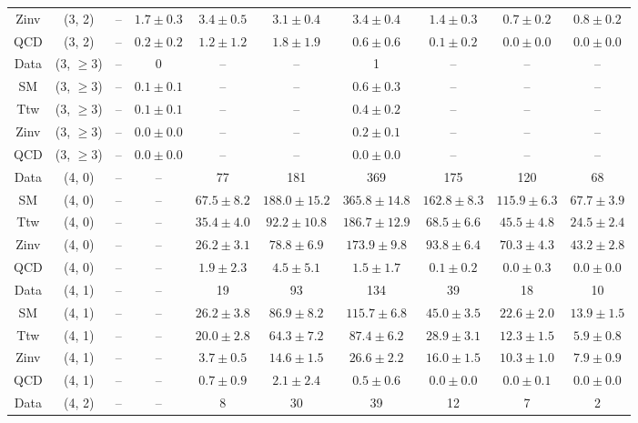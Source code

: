 \begin{table}[h!]
{\begin{tabular}{cccccccccc}
	Zinv & (3, 2) & -- & $1.7\pm 0.3$ & $3.4\pm 0.5$ & $3.1\pm 0.4$ & $3.4\pm 0.4$ & $1.4\pm 0.3$ & $0.7\pm 0.2$ & $0.8\pm 0.2$ \\[0.5ex] 
	QCD & (3, 2) & -- & $0.2\pm 0.2$ & $1.2\pm 1.2$ & $1.8\pm 1.9$ & $0.6\pm 0.6$ & $0.1\pm 0.2$ & $0.0\pm 0.0$ & $0.0\pm 0.0$ \\[0.5ex] 
	Data & (3, $\ge3$) & -- & 0 & -- & -- & 1 & -- & -- & -- \\[0.5ex] 
	SM & (3, $\ge3$) & -- & $0.1\pm 0.1$ & -- & -- & $0.6\pm 0.3$ & -- & -- & -- \\[0.5ex] 
	Ttw & (3, $\ge3$) & -- & $0.1\pm 0.1$ & -- & -- & $0.4\pm 0.2$ & -- & -- & -- \\[0.5ex] 
	Zinv & (3, $\ge3$) & -- & $0.0\pm 0.0$ & -- & -- & $0.2\pm 0.1$ & -- & -- & -- \\[0.5ex] 
	QCD & (3, $\ge3$) & -- & $0.0\pm 0.0$ & -- & -- & $0.0\pm 0.0$ & -- & -- & -- \\[0.5ex] 
	Data & (4, 0) & -- & -- & 77 & 181 & 369 & 175 & 120 & 68 \\[0.5ex] 
	SM & (4, 0) & -- & -- & $67.5\pm 8.2$ & $188.0\pm 15.2$ & $365.8\pm 14.8$ & $162.8\pm 8.3$ & $115.9\pm 6.3$ & $67.7\pm 3.9$ \\[0.5ex] 
	Ttw & (4, 0) & -- & -- & $35.4\pm 4.0$ & $92.2\pm 10.8$ & $186.7\pm 12.9$ & $68.5\pm 6.6$ & $45.5\pm 4.8$ & $24.5\pm 2.4$ \\[0.5ex] 
	Zinv & (4, 0) & -- & -- & $26.2\pm 3.1$ & $78.8\pm 6.9$ & $173.9\pm 9.8$ & $93.8\pm 6.4$ & $70.3\pm 4.3$ & $43.2\pm 2.8$ \\[0.5ex] 
	QCD & (4, 0) & -- & -- & $1.9\pm 2.3$ & $4.5\pm 5.1$ & $1.5\pm 1.7$ & $0.1\pm 0.2$ & $0.0\pm 0.3$ & $0.0\pm 0.0$ \\[0.5ex] 
	Data & (4, 1) & -- & -- & 19 & 93 & 134 & 39 & 18 & 10 \\[0.5ex] 
	SM & (4, 1) & -- & -- & $26.2\pm 3.8$ & $86.9\pm 8.2$ & $115.7\pm 6.8$ & $45.0\pm 3.5$ & $22.6\pm 2.0$ & $13.9\pm 1.5$ \\[0.5ex] 
	Ttw & (4, 1) & -- & -- & $20.0\pm 2.8$ & $64.3\pm 7.2$ & $87.4\pm 6.2$ & $28.9\pm 3.1$ & $12.3\pm 1.5$ & $5.9\pm 0.8$ \\[0.5ex] 
	Zinv & (4, 1) & -- & -- & $3.7\pm 0.5$ & $14.6\pm 1.5$ & $26.6\pm 2.2$ & $16.0\pm 1.5$ & $10.3\pm 1.0$ & $7.9\pm 0.9$ \\[0.5ex] 
	QCD & (4, 1) & -- & -- & $0.7\pm 0.9$ & $2.1\pm 2.4$ & $0.5\pm 0.6$ & $0.0\pm 0.0$ & $0.0\pm 0.1$ & $0.0\pm 0.0$ \\[0.5ex] 
	Data & (4, 2) & -- & -- & 8 & 30 & 39 & 12 & 7 & 2 \\[0.5ex] 

\end{tabular}}
\end{table}
